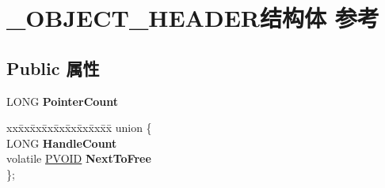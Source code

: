 \hypertarget{struct___o_b_j_e_c_t___h_e_a_d_e_r}{}\section{\+\_\+\+O\+B\+J\+E\+C\+T\+\_\+\+H\+E\+A\+D\+E\+R结构体 参考}
\label{struct___o_b_j_e_c_t___h_e_a_d_e_r}
\subsection*{Public 属性}
\begin{DoxyCompactItemize}
\item 
\mbox{\label{struct___o_b_j_e_c_t___h_e_a_d_e_r_a916e182e8d05f8a4e8e19fb0270d335d}} 
L\+O\+NG {\bfseries Pointer\+Count}
\item 
\mbox{\label{struct___o_b_j_e_c_t___h_e_a_d_e_r_a4e66b6fbc34a0f1e2cfb5439a16de614}} 
\begin{tabbing}
xx\=xx\=xx\=xx\=xx\=xx\=xx\=xx\=xx\=\kill
union \{\\
\>LONG {\bfseries HandleCount}\\
\>volatile \hyperlink{interfacevoid}{PVOID} {\bfseries NextToFree}\\
\}; \\


\end{tabbing}
\end{DoxyCompactItemize}
